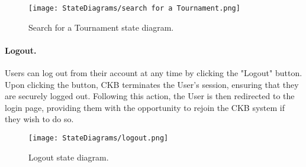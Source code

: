 \begin{figure}[H]
    \begin{center}
        \texttt{[image: StateDiagrams/search for a Tournament.png]}
        \caption{Search for a Tournament state diagram.}
        \label{fig:search_Tournament_sd}%
    \end{center}
\end{figure}

\paragraph{Logout.}
Users can log out from their account at any time by clicking the "Logout" button. Upon clicking the button, CKB terminates the User's session, ensuring that they are securely logged out. Following this action, the User is then redirected to the login page, providing them with the opportunity to rejoin the CKB system if they wish to do so. 

\begin{figure}[H]
    \begin{center}
        \texttt{[image: StateDiagrams/logout.png]}
        \caption{Logout state diagram.}
        \label{fig:logout_sd}%
    \end{center}
\end{figure}

